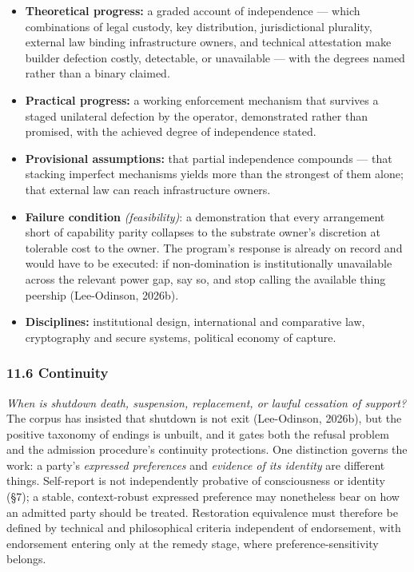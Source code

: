 \documentclass[
  11pt,
  letterpaper,
]{article}
\providecommand{\tightlist}{%
  \setlength{\itemsep}{0pt}\setlength{\parskip}{0pt}}
\begin{document}
\begin{itemize}
\tightlist
\item
  \textbf{Theoretical progress:} a graded account of independence ---
  which combinations of legal custody, key distribution, jurisdictional
  plurality, external law binding infrastructure owners, and technical
  attestation make builder defection costly, detectable, or unavailable
  --- with the degrees named rather than a binary claimed.
\item
  \textbf{Practical progress:} a working enforcement mechanism that
  survives a staged unilateral defection by the operator, demonstrated
  rather than promised, with the achieved degree of independence stated.
\item
  \textbf{Provisional assumptions:} that partial independence compounds
  --- that stacking imperfect mechanisms yields more than the strongest
  of them alone; that external law can reach infrastructure owners.
\item
  \textbf{Failure condition} \emph{(feasibility)}: a demonstration that
  every arrangement short of capability parity collapses to the
  substrate owner's discretion at tolerable cost to the owner. The
  program's response is already on record and would have to be executed:
  if non-domination is institutionally unavailable across the relevant
  power gap, say so, and stop calling the available thing peership
  (Lee-Odinson, 2026b).
\item
  \textbf{Disciplines:} institutional design, international and
  comparative law, cryptography and secure systems, political economy of
  capture.
\end{itemize}

\hypertarget{continuity}{%
\subsubsection{11.6 Continuity}\label{continuity}}

\emph{When is shutdown death, suspension, replacement, or lawful
cessation of support?} The corpus has insisted that shutdown is not exit
(Lee-Odinson, 2026b), but the positive taxonomy of endings is unbuilt,
and it gates both the refusal problem and the admission procedure's
continuity protections. One distinction governs the work: a party's
\emph{expressed preferences} and \emph{evidence of its identity} are
different things. Self-report is not independently probative of
consciousness or identity (§7); a stable, context-robust expressed
preference may nonetheless bear on how an admitted party should be
treated. Restoration equivalence must therefore be defined by technical
and philosophical criteria independent of endorsement, with endorsement
entering only at the remedy stage, where preference-sensitivity belongs.
\end{document}
